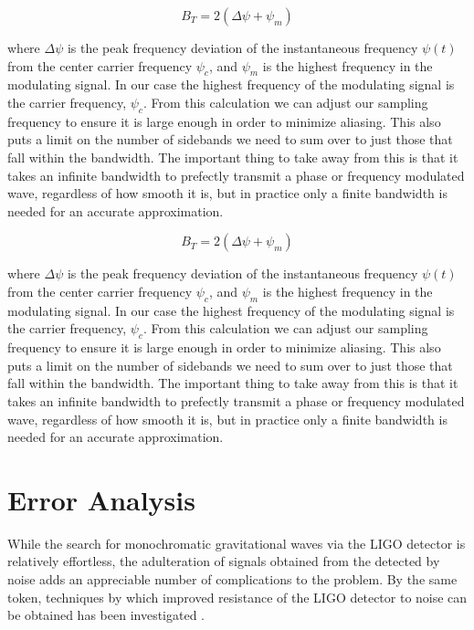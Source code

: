 \documentclass[onecolumn, groupedaddress, 10pt]{revtex4-1}
\begin{document}
\begin{equation}
B_T = 2(\Delta\psi + \psi_m)
\end{equation}

where $\Delta\psi$ is the peak frequency deviation of the instantaneous frequency $\psi(t)$ from the center carrier frequency $\psi_c$, and $\psi_m$ is the highest frequency in the modulating signal. In our case the highest frequency of the modulating signal is the carrier frequency, $\psi_c$. From this calculation we can adjust our sampling frequency to ensure it is large enough in order to minimize aliasing. This also puts a limit on the number  of sidebands we need to sum over to just those that fall within the bandwidth.  The important thing to take away from this is that it takes an infinite bandwidth to prefectly transmit a phase or frequency modulated wave, regardless of how smooth it is, but in practice only a finite bandwidth is needed for an accurate approximation.

\begin{equation}
B_T = 2(\Delta\psi + \psi_m)
\end{equation}

where $\Delta\psi$ is the peak frequency deviation of the instantaneous frequency $\psi(t)$ from the center carrier frequency $\psi_c$, and $\psi_m$ is the highest frequency in the modulating signal. In our case the highest frequency of the modulating signal is the carrier frequency, $\psi_c$. From this calculation we can adjust our sampling frequency to ensure it is large enough in order to minimize aliasing. This also puts a limit on the number  of sidebands we need to sum over to just those that fall within the bandwidth.  The important thing to take away from this is that it takes an infinite bandwidth to prefectly transmit a phase or frequency modulated wave, regardless of how smooth it is, but in practice only a finite bandwidth is needed for an accurate approximation.
 

\section{Error Analysis}
While the search for monochromatic gravitational waves via the LIGO detector is relatively effortless, the adulteration of signals obtained from the detected by noise adds an appreciable number of complications to the problem. By the same token, techniques by which improved resistance of the LIGO detector to noise can be obtained has been investigated \citep{abramovici1996improved} \citep{aasi2013enhanced}.
\end{document}
